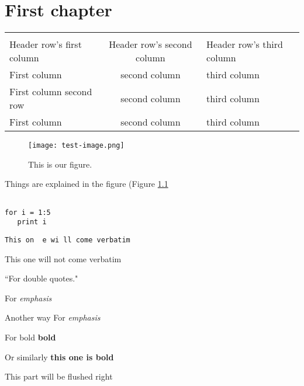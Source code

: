 \documentclass[12pt,a4paper]{report}
\begin{document}
\tableofcontents

\chapter{First chapter}

   

\vspace*{2cm}

\begin{tabular}{|l|c|p{4cm}|}
\hline  \\[-3mm]
Header row's first column & 
Header row's second column & 
Header row's third column \\
\hline \hline
First column & second column & third column \\
First column second row & second column & third column \\
First column & second column & third column \\ \hline
\end{tabular}


\begin{figure}[h] 
\texttt{[image: test-image.png]}
\caption{This is our figure.} \label{ourfigure}
\end{figure}

Things are explained in the figure (Figure \ref{ourfigure}

\begin{lstlisting}

for i = 1:5
   print i

\end{lstlisting}

\vspace{5cm}

\verb*&This on  e wi ll come verbatim&

\noindent
This one will not come verbatim



``For double quotes."

For {\em emphasis}

Another way
For \emph{emphasis}

For bold \textbf{bold}

Or similarly {\bf this one is bold}

\begin{flushright}
This part will be flushed right
\end{flushright}
\end{document}

